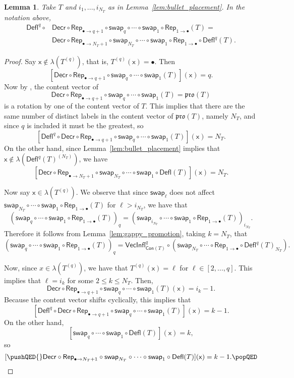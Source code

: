 \documentclass[12pt]{amsart}
\newcommand{\x}{\ensuremath{\mathsf{x}}}
\newtheorem{lemma}[theorem]{Lemma}
\theoremstyle{definition}
\theoremstyle{remark}
\numberwithin{equation}{section}
\newcommand{\pro}{\mathfrak{pro}}
\newcommand{\swap}{\ensuremath{\mathsf{swap}}}
\newcommand{\decr}{\ensuremath{\mathsf{Decr}}}
\newcommand{\rep}{\ensuremath{\mathsf{Rep}}}
\newcommand{\deflate}{\ensuremath{\mathsf{Defl}}}
\newcommand{\inflate}{\ensuremath{\mathsf{VecInfl}}}
\newcommand{\content}{\ensuremath{\mathsf{Con}}}
\begin{document}
\begin{lemma}\label{lem:deflation_commutation}
Take $T$ and $i_1,...,i_{N_T}$ as in Lemma~\ref{lem:bullet_placement}. In the notation above, 
\begin{align*}
 \deflate^q \circ &\decr \circ \rep_{\bullet \rightarrow q+1} \circ \swap_q \circ \cdots \circ \swap_1\circ \rep_{1 \rightarrow \bullet} (T) = \\
 & \decr \circ \rep_{\bullet \rightarrow N_T+1} \circ \swap_{N_T} \circ \cdots \circ \swap_1 \circ \rep_{1 \rightarrow \bullet} \circ \deflate^q (T). 
\end{align*}
\end{lemma}
\begin{proof}
Say $\x \not \in \lambda(T^{(q)})$, that is,  $T^{(q)}(\x) = \bullet$.  Then 
\[
[\decr \circ \rep_{\bullet \rightarrow q+1} \circ \swap_q \circ \cdots \circ \swap_1 (T)](\x) = q.
\]
Now by \cite[Lemma~2.1]{DPS}, the content vector of  
\[
\decr \circ \rep_{\bullet \rightarrow q+1} \circ \swap_q \circ \cdots \circ \swap_1 (T) = \pro(T)
\]
 is a rotation by one of the content vector of $T$. This implies that there are the same number of distinct labels in the content vector of $\pro(T)$, namely $N_T$, and since $q$ is included it must be the greatest, so 
 \[
 [\deflate^q \circ \decr \circ \rep_{\bullet \rightarrow q+1} \circ \swap_q \circ \cdots \circ \swap_1 (T)](\x) = N_T.
 \]
  On the other hand, since Lemma~\ref{lem:bullet_placement} implies that $\x \not \in \lambda(\deflate^q(T)^{(N_T)})$, we have
  \[
  [\decr \circ \rep_{\bullet \rightarrow N_T + 1} \circ \swap_{N_T} \circ \cdots \circ \swap_1 \circ \deflate(T)](\x) = N_T.
  \] 

Now say $\x \in \lambda(T^{(q)})$. We observe that since $\swap_\ell$ does not affect $\swap_{N_T} \circ \cdots \circ \swap_1 \circ \rep_{1 \rightarrow \bullet} (T)$ for $\ell > i_{N_T}$, we have that
\[ (\swap_q \circ \cdots \circ \swap_1 \circ \rep_{1 \rightarrow \bullet}( T ))_q = (\swap_{i_{N_T}} \circ \cdots \circ \swap_1 \circ \rep_{1 \rightarrow \bullet}( T ))_{i_{N_T}}.  \]
Therefore it follows from Lemma~\ref{lem:gappy_promotion}, taking $k = N_T$, that 
\[ (\swap_q \circ \cdots \circ \swap_1 \circ \rep_{1 \rightarrow \bullet}( T ))_q = \inflate^q_{\content(T)} \circ (\swap_{N_T} \circ \cdots \circ  \rep_{1 \rightarrow \bullet} \circ \deflate^q(T)_{N_T}). \]

Now, since $x \in \lambda(T^{(q)})$, we have that $T^{(q)}(\x) = \ell$ for $\ell \in [2,...,q]$. This implies that $\ell = i_k$ for some $2 \leq k \leq N_T$. Then, 
\[
\decr \circ \rep_{\bullet \to q+1} \circ \swap_q \circ \cdots \circ \swap_1 (T)(\x) = i_k-1.
\]
Because the content vector shifts cyclically, this implies that 
 \[
 [\deflate^q \circ \decr \circ \rep_{\bullet \rightarrow q+1} \circ \swap_q \circ \cdots \circ \swap_1 (T)](\x) = k-1.
 \]
  On the other hand, 
  \[
  [\swap_q \circ \cdots \circ \swap_1 \circ \deflate(T)](\x) = k,
  \]
   so 
   \[
   [ \pushQED{\qed} \decr \circ \rep_{\bullet \rightarrow N_T + 1} \circ \swap_{N_T} \circ \cdots \circ \swap_1 \circ  \deflate(T)](\x) = k-1. \qedhere \popQED \] \let\qed\relax
\end{proof}
\end{document}
